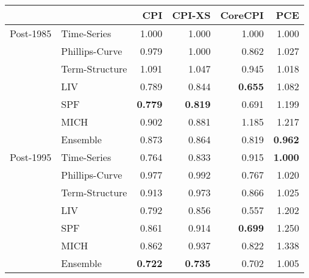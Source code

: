 \begin{tabular}{llrrrr}
\toprule
          &             &    CPI &  CPI-XS &  CoreCPI &    PCE \\
\midrule
Post-1985 & Time-Series &  1.000 &   1.000 &     1.000 &  1.000 \\
          & Phillips-Curve &  0.979 &   1.000 &     0.862 &  1.027 \\
          & Term-Structure &  1.091 &   1.047 &     0.945 &  1.018 \\
          & LIV &  0.789 &   0.844 &\textbf{0.655}&  1.082 \\
          & SPF &\textbf{0.779}&\textbf{0.819}&     0.691 &  1.199 \\
          & MICH &  0.902 &   0.881 &     1.185 &  1.217 \\
          & Ensemble &  0.873 &   0.864 &     0.819 &\textbf{0.962}\\ \midrule
Post-1995 & Time-Series &  0.764 &   0.833 &     0.915 &\textbf{1.000}\\
          & Phillips-Curve &  0.977 &   0.992 &     0.767 &  1.020 \\
          & Term-Structure &  0.913 &   0.973 &     0.866 &  1.025 \\
          & LIV &  0.792 &   0.856 &     0.557 &  1.202 \\
          & SPF &  0.861 &   0.914 &\textbf{0.699}&  1.250 \\
          & MICH &  0.862 &   0.937 &     0.822 &  1.338 \\
          & Ensemble &\textbf{0.722}&\textbf{0.735}&     0.702 &  1.005 \\
\bottomrule
\end{tabular}
